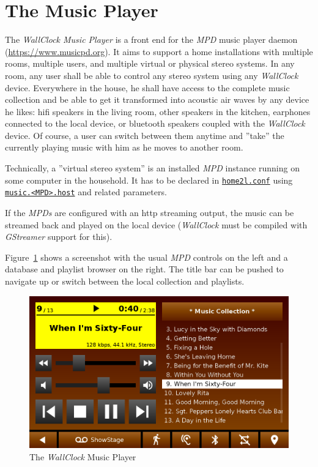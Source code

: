 \documentclass[12pt,english,parskip=half,headheight=19pt]{scrreprt}
\newcommand{\idx}[1]{#1\index{#1}}
\newcommand{\refenv}[1]{\hyperref[env:#1]{\texttt{#1}}}        %
\newcommand{\reftool}[1]{\hyperref[tool:#1]{\texttt{\idx{#1}}}}
\begin{document}
\section{The Music Player}
\label{sec:wallclock-music}


The \textit{WallClock Music Player} is a front end for the
\textit{MPD} music player daemon (\url{https://www.musicpd.org}). It aims to support a home
installations with multiple rooms, multiple users, and multiple virtual or physical
stereo systems. In any room, any user shall be able to control any
stereo system using any \textit{WallClock} device. Everywhere in the house,
he shall have access to the complete music collection and be able to
get it transformed into acoustic air waves by any device he likes:
hifi speakers in the living room, other speakers in the kitchen,
earphones connected to the local device, or bluetooth speakers
coupled with the \textit{WallClock} device. Of course, a user can switch
between them anytime and ''take'' the currently playing music with him as
he moves to another room.

Technically, a ''virtual stereo system'' is an installed \textit{MPD}
instance running on some computer in the household. It has to be
declared in \reftool{home2l.conf} using \refenv{music.<MPD>.host}
and related parameters.

If the \textit{MPDs} are configured with an http streaming output, the
music can be streamed back and played on the local device (\textit{WallClock}
must be compiled with \textit{GStreamer} support for this).

Figure~\ref{fig:screen-wallclock-music} shows a screenshot
with the usual \textit{MPD} controls on the left and a database and
playlist browser on the right. The title bar can be pushed to navigate
up or switch between the local collection and playlists.

\begin{figure}[ht]
  \centering
  \includegraphics[width=0.7\linewidth]{figs/wallclock-music.png}
  \caption[l]{The \textit{WallClock} Music Player}
  \label{fig:screen-wallclock-music}
\end{figure}
\end{document}
